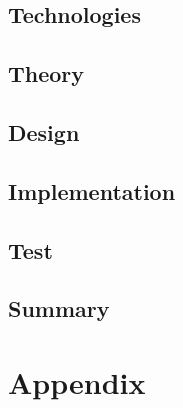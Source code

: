 






 
\tableofcontents








\chapter{Technologies}



\chapter{Theory}


\chapter{Design}


\chapter{Implementation}

\chapter{Test}




\chapter{Summary}




\printbibliography

\part{Appendix}
\appendix



 
